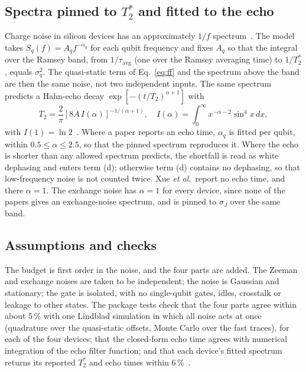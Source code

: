 \documentclass[reprint,aps,pra,floatfix,superscriptaddress,longbibliography,nofootinbib]{revtex4-2}
\newcommand{\Ts}{T_2^{*}}
\begin{document}
\subsection{Spectra pinned to $\Ts$ and fitted to the echo}

Charge noise in silicon devices has an approximately $1/f$ spectrum~\cite{paladino2014,yoneda2018,connors2022}. The model takes $S_q(f) = A_q f^{-\alpha_q}$ for each qubit frequency and fixes $A_q$ so that the integral over the Ramsey band, from $1/\tau_\mathrm{avg}$ (one over the Ramsey averaging time) to $1/\Ts$, equals $\sigma_q^2$. The quasi-static term of Eq.~\eqref{eq:ff} and the spectrum above the band are then the same noise, not two independent inputs. The same spectrum predicts a Hahn-echo decay $\exp[-(t/T_2)^{\alpha+1}]$ with
\begin{equation}
T_2 = \frac{2}{\pi}\left[8 A\, I(\alpha)\right]^{-1/(\alpha+1)}, \quad I(\alpha) = \int_0^\infty x^{-\alpha-2}\sin^4 x\,dx,
\end{equation}
with $I(1)=\ln 2$~\cite{cywinski2008}. Where a paper reports an echo time, $\alpha_q$ is fitted per qubit, within $0.5\le\alpha\le2.5$, so that the pinned spectrum reproduces it. Where the echo is shorter than any allowed spectrum predicts, the shortfall is read as white dephasing and enters term (d); otherwise term (d) contains no dephasing, so that low-frequency noise is not counted twice. Xue \emph{et al.}\ report no echo time, and there $\alpha=1$. The exchange noise has $\alpha=1$ for every device, since none of the papers gives an exchange-noise spectrum, and is pinned to $\sigma_J$ over the same band.

\subsection{Assumptions and checks}

The budget is first order in the noise, and the four parts are added. The Zeeman and exchange noises are taken to be independent; the noise is Gaussian and stationary; the gate is isolated, with no single-qubit gates, idles, crosstalk or leakage to other states. The package tests check that the four parts agree within about 5\,\% with one Lindblad simulation in which all noise acts at once (quadrature over the quasi-static offsets, Monte Carlo over the fast traces), for each of the four devices; that the closed-form echo time agrees with numerical integration of the echo filter function; and that each device's fitted spectrum returns its reported $\Ts$ and echo times within 6\,\%~\cite{code}.
\end{document}
